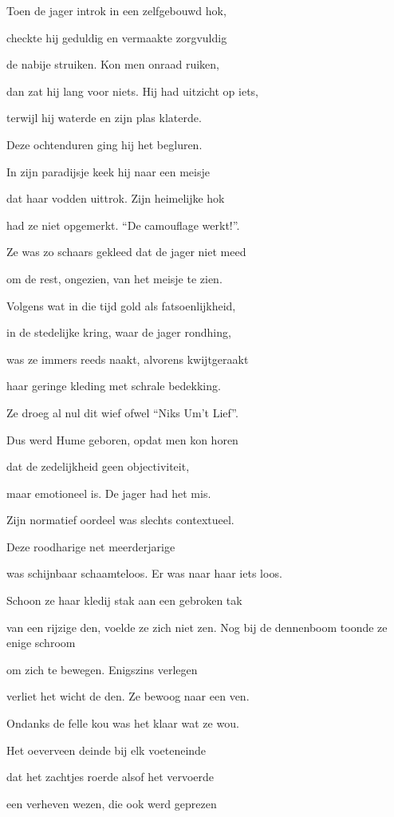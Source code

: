 Toen de jager introk
in een zelfgebouwd hok,

checkte hij geduldig
en vermaakte zorgvuldig

de nabije struiken.
Kon men onraad ruiken,

dan zat hij lang voor niets.
Hij had uitzicht op iets,

terwijl hij waterde
en zijn plas klaterde.

Deze ochtenduren
ging hij het begluren.

In zijn paradijsje
keek hij naar een meisje

dat haar vodden uittrok.
Zijn heimelijke hok

had ze niet opgemerkt.
“De camouflage werkt!”.

Ze was zo schaars gekleed
dat de jager niet meed

om de rest, ongezien,
van het meisje te zien.

Volgens wat in die tijd
gold als fatsoenlijkheid,

in de stedelijke kring,
waar de jager rondhing,

was ze immers reeds naakt,
alvorens kwijtgeraakt

haar geringe kleding
met schrale bedekking.

Ze droeg al nul dit wief
ofwel “Niks Um’t Lief”.

Dus werd Hume geboren,
opdat men kon horen

dat de zedelijkheid
geen objectiviteit,

maar emotioneel is.
De jager had het mis.

Zijn normatief oordeel
was slechts contextueel.

Deze roodharige
net meerderjarige

was schijnbaar schaamteloos.
Er was naar haar iets loos.

Schoon ze haar kledij stak
aan een gebroken tak

van een rijzige den,
voelde ze zich niet zen.
Nog bij de dennenboom
toonde ze enige schroom

om zich te bewegen.
Enigszins verlegen

verliet het wicht de den.
Ze bewoog naar een ven.

Ondanks de felle kou
was het klaar wat ze wou.

Het oeverveen deinde
bij elk voeteneinde

dat het zachtjes roerde
alsof het vervoerde

een verheven wezen,
die ook werd geprezen

